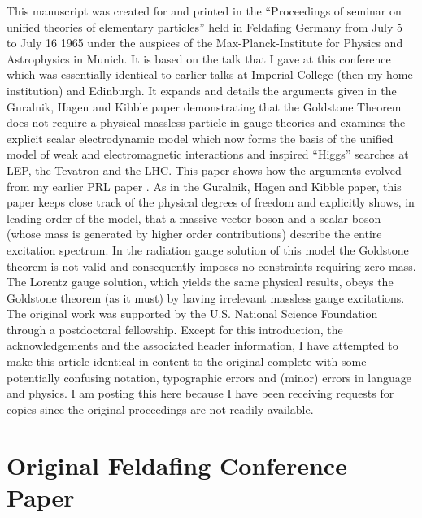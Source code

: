 \documentclass[%
  12pt,
  paper=letter,
  abstracton,
  pagesize=auto,
  version=last,
  DIV=calc
  ]{article}
\begin{document}
This manuscript was created for and printed in the ``Proceedings of
seminar on unified theories of elementary particles'' held in Feldafing
Germany from July 5 to July 16 1965 under the auspices of the
Max-Planck-Institute for Physics and Astrophysics in Munich. It is
based on the talk that I gave at this conference which was essentially
identical to earlier talks at Imperial College (then my home
institution) and Edinburgh. It expands and details the arguments given
in the Guralnik, Hagen and Kibble paper \cite{13} demonstrating that
the Goldstone Theorem does not require a physical massless particle in
gauge theories  and examines the explicit scalar electrodynamic model
which now forms the basis of the unified model of weak and
electromagnetic interactions and inspired ``Higgs'' searches at LEP, the
Tevatron and the LHC. This paper shows how the arguments evolved from
my earlier PRL paper \cite{10}. As in the Guralnik, Hagen and Kibble
paper, this paper keeps close track of the physical degrees of freedom
and explicitly shows, in leading order of the model, that a massive
vector boson and a scalar boson (whose mass is generated by higher
order contributions) describe the entire excitation spectrum. In the
radiation gauge solution of this model the  Goldstone theorem is not
valid and consequently imposes no constraints requiring zero mass. The
Lorentz gauge solution, which yields the same physical results, obeys
the Goldstone theorem (as it must) by having irrelevant massless gauge
excitations. The original work was supported by the U.S. National
Science Foundation through a postdoctoral fellowship. Except for this
introduction, the acknowledgements and the associated header information, I have attempted to
make this article identical in content to the original complete with
some potentially confusing notation, typographic errors and (minor) errors in language and physics. I am posting this here because I have been receiving requests for copies since the original proceedings are
not readily available.

\section{Original Feldafing Conference Paper}
\end{document}
